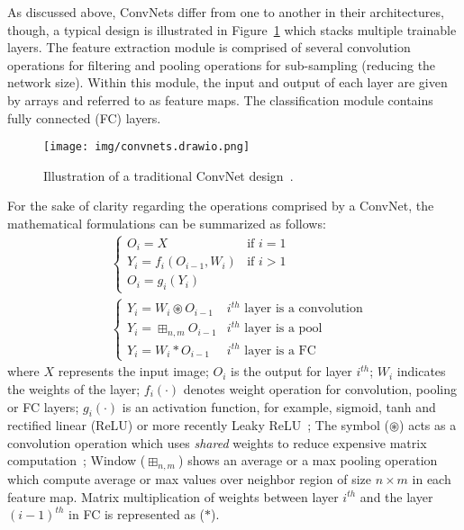 \documentclass{ieeeaccess}
\begin{document}
As discussed above, ConvNets differ from one to another in their architectures, though, a typical design is illustrated in Figure~\ref{fig:convnet} which stacks multiple trainable layers. The feature extraction module is comprised of several convolution operations for filtering and pooling operations for sub-sampling (reducing the network size). Within this module, the input and output of each layer are given by arrays and referred to as feature maps. The classification module contains fully connected (FC) layers.
\begin{figure} [hbt!]
\begin{center}
\texttt{[image: img/convnets.drawio.png]}
\caption{Illustration of a traditional ConvNet design~\cite{lecun2010convolutional}.}
\label{fig:convnet}
\end{center}
\end{figure}


For the sake of clarity regarding the operations comprised by a ConvNet, the mathematical formulations can be summarized as follows:
\begin{align}
& \begin{cases}
      O_{i}=X & \text{if $i=1$}\\
      Y_{i}=f_{i}(O_{i-1},W_{i}) & \text{if $i>1$}\\
      O_{i}=g_{i}(Y_{i})
  \end{cases} \\
& \begin{cases}
      Y_{i}=W_{i} \circledast O_{i-1} & \text{$i^{th}$ layer is a convolution}\\
      Y_{i}=\boxplus_{n,m} O_{i-1} & \text{$i^{th}$ layer is a pool}\\
      Y_{i}=W_{i}*O_{i-1} & \text{$i^{th}$ layer is a FC}      
  \end{cases}         
\end{align}
where $X$ represents the input image; $O_{i}$ is the output for layer $i^{th}$; $W_{i}$ indicates the weights of the layer; $f_{i}(\cdot)$ denotes weight operation for convolution, pooling or FC layers; $g_{i}(\cdot)$ is an activation function, for example, sigmoid, tanh and rectified linear (ReLU) or more recently Leaky ReLU~\cite{maas2013rectifier}; The symbol ($\circledast$) acts as a convolution operation which uses \textit{shared} weights to reduce expensive matrix computation~\cite{lecun2010convolutional}; Window ($\boxplus_{n,m}$) shows an average or a max pooling operation which compute average or max values over neighbor region of size $n \times m$ in each feature map. Matrix multiplication of weights between layer $i^{th}$ and the layer $(i-1)^{th}$ in FC is represented as ($*$).
\end{document}
